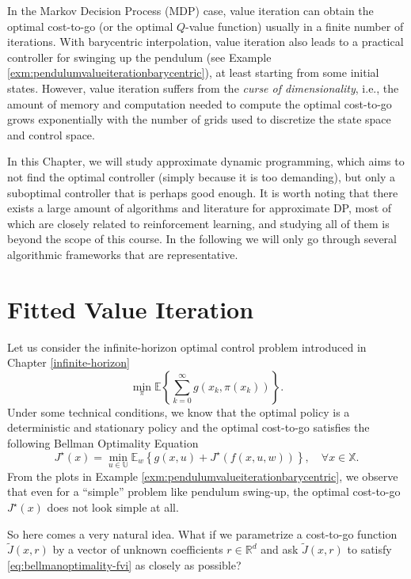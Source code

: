 \documentclass[
]{book}
\theoremstyle{definition}
\theoremstyle{definition}
\theoremstyle{definition}
\theoremstyle{definition}
\theoremstyle{remark}
\begin{document}
In the Markov Decision Process (MDP) case, value iteration can obtain the optimal cost-to-go (or the optimal \(Q\)-value function) usually in a finite number of iterations. With barycentric interpolation, value iteration also leads to a practical controller for swinging up the pendulum (see Example \ref{exm:pendulumvalueiterationbarycentric}), at least starting from some initial states. However, value iteration suffers from the \emph{curse of dimensionality}, i.e., the amount of memory and computation needed to compute the optimal cost-to-go grows exponentially with the number of grids used to discretize the state space and control space.

In this Chapter, we will study approximate dynamic programming, which aims to not find the optimal controller (simply because it is too demanding), but only a suboptimal controller that is perhaps good enough. It is worth noting that there exists a large amount of algorithms and literature for approximate DP, most of which are closely related to reinforcement learning, and studying all of them is beyond the scope of this course. In the following we will only go through several algorithmic frameworks that are representative.

\hypertarget{fitted-value-iteration}{%
\section{Fitted Value Iteration}\label{fitted-value-iteration}}

Let us consider the infinite-horizon optimal control problem introduced in Chapter \ref{infinite-horizon}
\[
\min_{\pi} \mathbb{E} \left\{ \sum_{k=0}^\infty g(x_k, \pi(x_k)) \right\}.
\]
Under some technical conditions, we know that the optimal policy is a deterministic and stationary policy and the optimal cost-to-go satisfies the following Bellman Optimality Equation
\begin{equation}
J^\star(x) = \min_{u \in \mathbb{U}} \mathbb{E}_w \left\{ g(x,u) + J^\star(f(x,u,w)) \right\}, \quad \forall x \in \mathbb{X}.
\label{eq:bellmanoptimality-fvi}
\end{equation}
From the plots in Example \ref{exm:pendulumvalueiterationbarycentric}, we observe that even for a ``simple'' problem like pendulum swing-up, the optimal cost-to-go \(J^\star(x)\) does not look simple at all.

So here comes a very natural idea. What if we parametrize a cost-to-go function \(\tilde{J}(x,r)\) by a vector of unknown coefficients \(r \in \mathbb{R}^{d}\) and ask \(\tilde{J}(x,r)\) to satisfy \eqref{eq:bellmanoptimality-fvi} as closely as possible?
\end{document}
